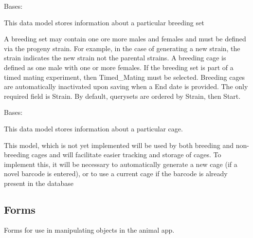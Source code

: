 \documentclass[letterpaper,10pt,english]{sphinxmanual}
\begin{document}
\begin{fulllineitems}
\label{api:animal.models.Breeding}
Bases: 

This data model stores information about a particular breeding set

A breeding set may contain one ore more males and females and must be defined via the progeny strain.  For example, in the case of generating a new strain, the strain indicates the new strain not the parental strains.  A breeding cage is defined as one male with one or more females.  If the breeding set is part of a timed mating experiment, then Timed\_Mating must be selected.  Breeding cages are automatically inactivated upon saving when a End date is provided.  The only required field is Strain.  By default, querysets are ordered by Strain, then Start.

\end{fulllineitems}


\begin{fulllineitems}
\label{api:animal.models.Cage}
Bases: 

This data model stores information about a particular cage.

This model, which is not yet implemented will be used by both breeding and non-breeding cages and will facilitate easier tracking and storage of cages.  To implement this, it will be necessary to automatically generate a new cage (if a novel barcode is entered), or to use a current cage if the barcode is already present in the database

\end{fulllineitems}



\subsection{Forms}
\label{api:id2}\label{api:module-animal.forms}
Forms for use in manipulating objects in the animal app.
\end{document}
